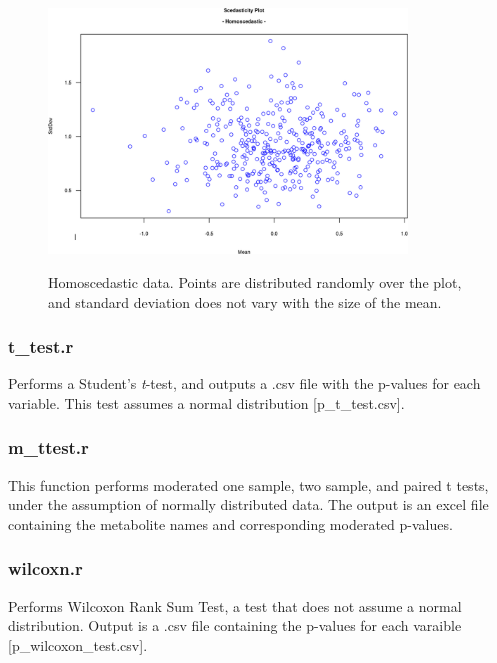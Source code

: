 \documentclass[english,a4paper,12pt]{article}
\begin{document}
\begin{figure}[!hpb]
    \centering
    \includegraphics[width=0.85\textwidth]{images/homosced.png} \\
    \caption[Homoscedasticity]{Homoscedastic data. Points are distributed randomly over the plot, and standard deviation does not vary with the size of the mean.}
    \label{fig:homosced}
\end{figure}

\subsubsection*{t\_test.r}
Performs a Student's \emph{t}-test, and outputs a .csv file with the p-values for each variable. This test assumes a normal distribution [\textsf{p\_t\_test.csv}].

\subsubsection*{m\_ttest.r}
This function performs moderated one sample, two sample, and paired t tests, under the assumption of normally distributed data. The output is an excel file containing the metabolite names and corresponding moderated p-values.

\subsubsection*{wilcoxn.r}
Performs Wilcoxon Rank Sum Test, a test that does not assume a normal distribution. Output is a .csv file containing the p-values for each varaible [\textsf{p\_wilcoxon\_test.csv}].
\end{document}
